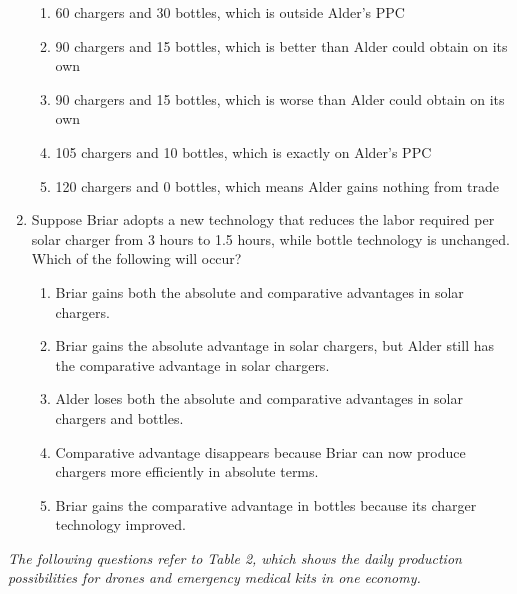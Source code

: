 \documentclass[10pt]{article}
\newenvironment{choiceslist}
  {\begin{enumerate}[label=(\Alph*), leftmargin=1.6em, itemsep=0.12em, topsep=0.18em, parsep=0pt]}
  {\end{enumerate}}
\newenvironment{stimulus}
  {\begin{center}\begin{minipage}{0.96\columnwidth}\footnotesize\itshape\setlength{\tabcolsep}{3pt}\renewcommand{\arraystretch}{0.96}}
  {\end{minipage}\end{center}}
\begin{document}
\begin{multicols*}{2}
\begin{enumerate}[series=apq, leftmargin=*, itemsep=0.85em, topsep=0.2em, parsep=0pt]
\begin{choiceslist}
\item 60 chargers and 30 bottles, which is outside Alder's PPC
\item 90 chargers and 15 bottles, which is better than Alder could obtain on its own
\item 90 chargers and 15 bottles, which is worse than Alder could obtain on its own
\item 105 chargers and 10 bottles, which is exactly on Alder's PPC
\item 120 chargers and 0 bottles, which means Alder gains nothing from trade
\end{choiceslist}
\item Suppose Briar adopts a new technology that reduces the labor required per solar charger from 3 hours to 1.5 hours, while bottle technology is unchanged. Which of the following will occur?
\begin{choiceslist}
\item Briar gains both the absolute and comparative advantages in solar chargers.
\item Briar gains the absolute advantage in solar chargers, but Alder still has the comparative advantage in solar chargers.
\item Alder loses both the absolute and comparative advantages in solar chargers and bottles.
\item Comparative advantage disappears because Briar can now produce chargers more efficiently in absolute terms.
\item Briar gains the comparative advantage in bottles because its charger technology improved.
\end{choiceslist}
\end{enumerate}
\begin{stimulus}
The following questions refer to Table 2, which shows the daily production possibilities for drones and emergency medical kits in one economy.


\end{stimulus}
\end{multicols*}
\end{document}
